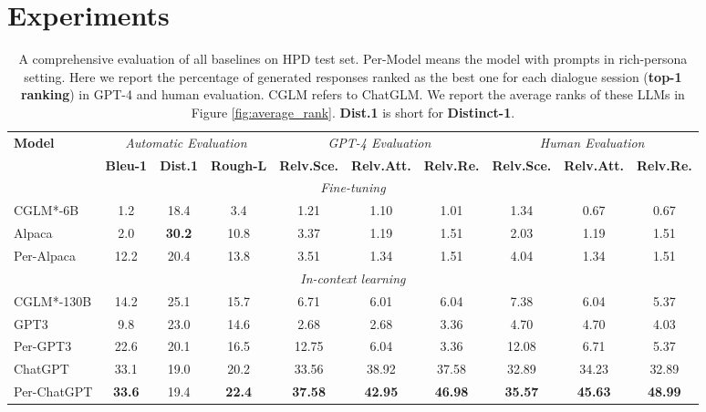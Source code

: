 \documentclass[11pt]{article}
\begin{document}
 





%
 \section{Experiments}
\begin{table*}[t]
    \begin{center}
    \centering
    \small
\begin{tabular}{l|ccc|ccc|ccc}
    \toprule
   \multirow{2}{*}{\textbf{Model}} 
 & \multicolumn{3}{c}{\textit{Automatic Evaluation}}&\multicolumn{3}{c}{\textit{GPT-4 Evaluation}}&\multicolumn{3}{c}{\textit{Human Evaluation}} \\
 \cmidrule{2-10} 
 &\textbf{Bleu-1}&\textbf{Dist.1}&\textbf{Rough-L}& \textbf{Relv.Sce.} & \textbf{Relv.Att.} & \textbf{Relv.Re.} & \textbf{Relv.Sce.} & \textbf{Relv.Att.} & \textbf{Relv.Re.} \\
    \midrule
    \multicolumn{10}{c}{\textit{Fine-tuning}} \\
    \midrule
    CGLM*-6B &1.2 &18.4&3.4&1.21& 1.10 & 1.01 & 1.34&0.67&0.67\\
    Alpaca &2.0&\textbf{30.2}&10.8 &3.37&1.19& 1.51 &2.03 & 1.19&1.51 \\
Per-Alpaca &12.2&20.4&13.8 &3.51&1.34& 1.51 &4.04 & 1.34&1.51 \\
    
    \midrule
\multicolumn{10}{c}{\textit{In-context learning}} \\
    \midrule
CGLM*-130B& 14.2  & 25.1 &15.7 &6.71&6.01&6.04 &7.38&6.04&5.37 \\
GPT3 & 9.8& 23.0&14.6&2.68 &2.68&3.36&4.70&4.70&4.03\\
Per-GPT3 & 22.6 &20.1&16.5 &12.75&6.04& 3.36 &12.08&6.71&5.37\\
ChatGPT &33.1 &19.0 &20.2&33.56 &38.92 &37.58&32.89&34.23&32.89 \\
Per-ChatGPT & \textbf{33.6}  & 19.4 &\textbf{22.4}&\textbf{37.58}&\textbf{42.95} &\textbf{46.98}&\textbf{35.57}&\textbf{45.63}&\textbf{48.99}\\

    \bottomrule
    \end{tabular}
    \end{center}
    \caption{
A comprehensive evaluation of all baselines on HPD test set. Per-Model means the model with prompts in rich-persona setting. Here we report the percentage of generated responses ranked as the best one for each dialogue session (\textbf{top-1 ranking}) in GPT-4 and human evaluation. CGLM refers to ChatGLM.
We report the average ranks of these LLMs in Figure \ref{fig:average_rank}. \textbf{Dist.1} is short for \textbf{Distinct-1}.
    }\vspace{-10pt}
    
    \label{tab:chatgpt_evaluation}
\end{table*}
\end{document}
